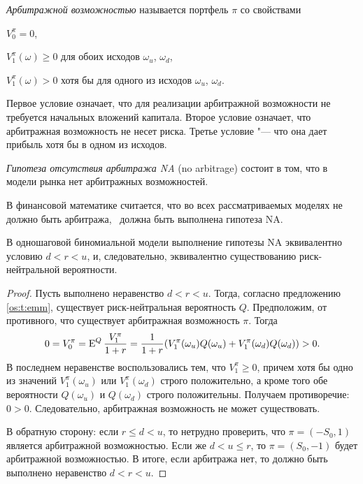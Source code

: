 \begin{definition}
\emph{Арбитражной возможностью} называется портфель $\pi$ со свойствами
\begin{alphenum}
\item $V_0^\pi = 0$,
\item $V_1^\pi(\omega) \ge 0$ для обоих исходов $\omega_u$, $\omega_d$,
\item $V_1^\pi(\omega) > 0$ хотя бы для одного из исходов $\omega_u$, $\omega_d$.
\end{alphenum}
\end{definition}
Первое условие означает, что для реализации арбитражной возможности не требуется начальных вложений капитала. Второе условие означает, что арбитражная возможность не несет риска. Третье условие "--- что она дает прибыль хотя бы в одном из исходов.

\begin{definition}
\emph{Гипотеза отсутствия арбитража NA} (no arbitrage) состоит в том, что в модели рынка нет арбитражных возможностей. 
\end{definition}

В финансовой математике считается, что во всех рассматриваемых моделях не должно быть арбитража, \te\ должна быть выполнена гипотеза NA.

\begin{proposition}
\label{os:ftap}
В одношаговой биномиальной модели выполнение гипотезы NA эквивалентно условию $d<r<u$, и, следовательно, эквивалентно существованию риск-нейтральной вероятности.
\end{proposition}

\begin{proof}
Пусть выполнено неравенство $d<r<u$. Тогда, согласно предложению \ref{os:t:emm}, существует риск-нейтральная вероятность $Q$.
Предположим, от противного, что существует арбитражная возможность $\pi$. Тогда 
\[
0 = V_0^\pi = \operatorname{E}^Q\frac{V_1^\pi}{1+r} 
= \frac{1}{1+r}( V_1^\pi(\omega_u) Q(\omega_u) + V_1^\pi(\omega_d) Q(\omega_d)) > 0.
\]
В последнем неравенстве воспользовались тем, что $V_1^\pi\ge 0$, причем хотя бы одно из значений $V_1^\pi(\omega_u)$ или $V_1^\pi(\omega_d)$ строго положительно, а кроме того обе вероятности $Q(\omega_u)$ и $Q(\omega_d)$ строго положительны.
Получаем противоречие: $0>0$.
Следовательно, арбитражная возможность не может существовать.

В обратную сторону: если $r\le d < u$, то нетрудно проверить, что $\pi = (-S_0,1)$ является арбитражной возможностью. Если же $d <u  \le r$, то $\pi = (S_0,-1)$ будет арбитражной возможностью.
В итоге, если арбитража нет, то должно быть выполнено неравенство $d<r<u$. 
\end{proof}

